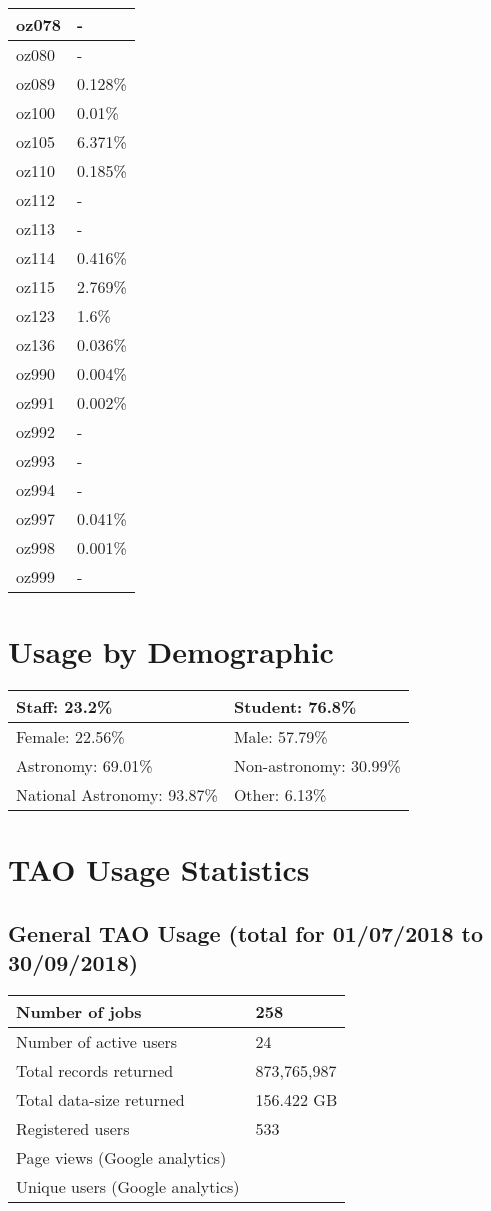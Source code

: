\documentclass{article}%
\begin{document}
\begin{longtabu}{X[l] X[r]}
\hline%
oz078&{-}\\%
\hline%
oz080&{-}\\%
\hline%
oz089&0.128\%\\%
\hline%
oz100&0.01\%\\%
\hline%
oz105&6.371\%\\%
\hline%
oz110&0.185\%\\%
\hline%
oz112&{-}\\%
\hline%
oz113&{-}\\%
\hline%
oz114&0.416\%\\%
\hline%
oz115&2.769\%\\%
\hline%
oz123&1.6\%\\%
\hline%
oz136&0.036\%\\%
\hline%
oz990&0.004\%\\%
\hline%
oz991&0.002\%\\%
\hline%
oz992&{-}\\%
\hline%
oz993&{-}\\%
\hline%
oz994&{-}\\%
\hline%
oz997&0.041\%\\%
\hline%
oz998&0.001\%\\%
\hline%
oz999&{-}\\%
\hline%
\end{longtabu}%
\section{Usage by Demographic}%

%
\begin{longtabu}{X[l] X[l]}%
Staff:  23.2\%&Student:  76.8\%\\%
\hline%
Female:  22.56\%&Male:  57.79\%\\%
\hline%
Astronomy:  69.01\%&Non{-}astronomy:  30.99\%\\%
\hline%
National Astronomy:  93.87\%&Other:  6.13\%\\%
\hline%
\end{longtabu}%
\newpage%
\section{TAO Usage Statistics}%

%
\subsection{General TAO Usage (total for 01/07/2018 to 30/09/2018)}%

%
\begin{longtabu}{X[l] X[l]}%
Number of jobs&258\\%
\hline%
Number of active users&24\\%
\hline%
Total records returned&873,765,987\\%
\hline%
Total data{-}size returned&156.422 GB\\%
\hline%
Registered users&533\\%
\hline%
Page views (Google analytics)&\\%
\hline%
Unique users (Google analytics)&\\%
\hline%
\end{longtabu}%
\end{document}
